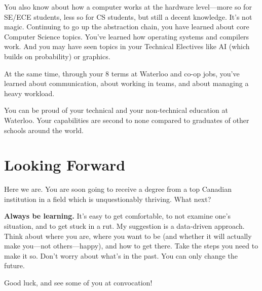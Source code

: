 \documentclass[11pt]{article}
\begin{document}
You also know about how a computer works at the hardware level---more
so for SE/ECE students, less so for CS students, but still a decent
knowledge. It's not magic. Continuing to go up the abstraction chain,
you have learned about core Computer Science topics. You've learned
how operating systems and compilers work. And you may have seen topics
in your Technical Electives like AI (which builds on probability)
or graphics.

At the same time, through your 8 terms at Waterloo and co-op jobs, you've
learned about communication, about working in teams, and about managing
a heavy workload.

You can be proud of your technical and your non-technical education at
Waterloo. Your capabilities are second to none compared to graduates
of other schools around the world.

\section*{Looking Forward}
Here we are. You are soon going to receive a degree from a top Canadian institution
in a field which is unquestionably thriving. What next?

{\bf Always be learning.} It's easy to get comfortable, to not examine
one's situation, and to get stuck in a rut. My suggestion is a
data-driven approach. Think about where you are, where you want to be
(and whether it will actually make you---not others---happy), and how to get
there. Take the steps you need to make it so. Don't worry about what's
in the past. You can only change the future.

Good luck, and see some of you at convocation!
\end{document}
